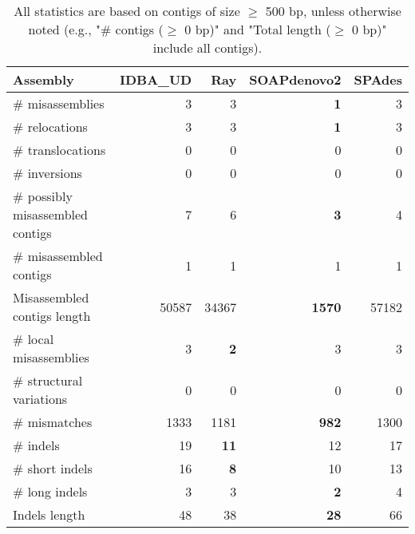 \documentclass[12pt,a4paper]{article}
\begin{document}
\begin{table}[ht]
\begin{center}
\caption{All statistics are based on contigs of size $\geq$ 500 bp, unless otherwise noted (e.g., "\# contigs ($\geq$ 0 bp)" and "Total length ($\geq$ 0 bp)" include all contigs).}
\begin{tabular}{|l*{4}{|r}|}
\hline
Assembly & IDBA\_UD & Ray & SOAPdenovo2 & SPAdes \\ \hline
\# misassemblies & 3 & 3 & {\bf 1} & 3 \\ \hline
\hspace{5mm}\# relocations & 3 & 3 & {\bf 1} & 3 \\ \hline
\hspace{5mm}\# translocations & 0 & 0 & 0 & 0 \\ \hline
\hspace{5mm}\# inversions & 0 & 0 & 0 & 0 \\ \hline
\# possibly misassembled contigs & 7 & 6 & {\bf 3} & 4 \\ \hline
\# misassembled contigs & 1 & 1 & 1 & 1 \\ \hline
Misassembled contigs length & 50587 & 34367 & {\bf 1570} & 57182 \\ \hline
\# local misassemblies & 3 & {\bf 2} & 3 & 3 \\ \hline
\# structural variations & 0 & 0 & 0 & 0 \\ \hline
\# mismatches & 1333 & 1181 & {\bf 982} & 1300 \\ \hline
\# indels & 19 & {\bf 11} & 12 & 17 \\ \hline
\hspace{5mm}\# short indels & 16 & {\bf 8} & 10 & 13 \\ \hline
\hspace{5mm}\# long indels & 3 & 3 & {\bf 2} & 4 \\ \hline
Indels length & 48 & 38 & {\bf 28} & 66 \\ \hline
\end{tabular}
\end{center}
\end{table}
\end{document}
